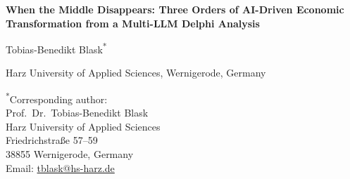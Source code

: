 \documentclass[12pt]{article}
\begin{document}
\begin{center}
{\Large\bfseries When the Middle Disappears: Three Orders of AI-Driven Economic Transformation from a Multi-LLM Delphi Analysis}

\vspace{1.5cm}

{\large Tobias-Benedikt Blask\textsuperscript{*}}

\vspace{0.5cm}

Harz University of Applied Sciences, Wernigerode, Germany

\vspace{1cm}

\textsuperscript{*}Corresponding author:\\
Prof.\ Dr.\ Tobias-Benedikt Blask\\
Harz University of Applied Sciences\\
Friedrichstra{\ss}e 57--59\\
38855 Wernigerode, Germany\\
Email: \href{mailto:tblask@hs-harz.de}{tblask@hs-harz.de}

\end{center}
\end{document}
